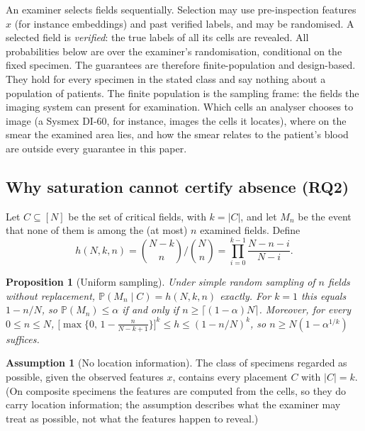 \documentclass[11pt]{article}
\newtheorem{proposition}{Proposition}
\theoremstyle{remark}
\theoremstyle{definition}
\newtheorem{assumption}{Assumption}
\newcommand{\Prb}{\mathbb{P}}
\begin{document}
An examiner selects fields sequentially. Selection may use pre-inspection features $x$ (for instance embeddings) and past verified labels, and may be randomised. A selected field is \emph{verified}: the true labels of all its cells are revealed. All probabilities below are over the examiner's randomisation, conditional on the fixed specimen. The guarantees are therefore finite-population and design-based. They hold for every specimen in the stated class and say nothing about a population of patients. The finite population is the sampling frame: the fields the imaging system can present for examination. Which cells an analyser chooses to image (a Sysmex DI-60, for instance, images the cells it locates), where on the smear the examined area lies, and how the smear relates to the patient's blood are outside every guarantee in this paper.

\subsection{Why saturation cannot certify absence (RQ2)}\label{sec:theory}
Let $C\subseteq[N]$ be the set of critical fields, with $k=|C|$, and let $M_n$ be the event that none of them is among the (at most) $n$ examined fields. Define
\[
h(N,k,n)=\binom{N-k}{n}\Big/\binom{N}{n}=\prod_{i=0}^{k-1}\frac{N-n-i}{N-i}.
\]

\begin{proposition}[Uniform sampling]\label{prop:uniform}
Under simple random sampling of $n$ fields without replacement, $\Prb(M_n\mid C)=h(N,k,n)$ exactly. For $k=1$ this equals $1-n/N$, so $\Prb(M_n)\le\alpha$ if and only if $n\ge\lceil(1-\alpha)N\rceil$. Moreover, for every $0\le n\le N$, $\big[\max\{0,\,1-\tfrac{n}{N-k+1}\}\big]^k\le h\le(1-n/N)^k$, so $n\ge N(1-\alpha^{1/k})$ suffices.
\end{proposition}

\begin{assumption}[No location information]\label{ass:A}
The class of specimens regarded as possible, given the observed features $x$, contains every placement $C$ with $|C|=k$. (On composite specimens the features are computed from the cells, so they do carry location information; the assumption describes what the examiner may treat as possible, not what the features happen to reveal.)
\end{assumption}
\end{document}
